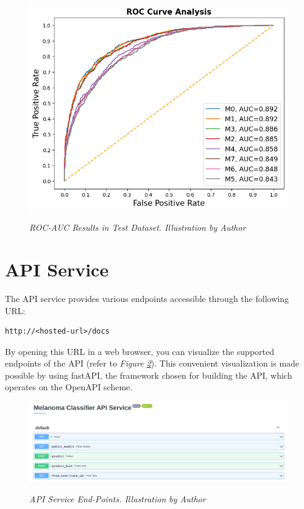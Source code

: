 \begin{figure}[H]
\centering
    \includegraphics[width=\textwidth]{imatges/results/rocaucanalysis-all.png}
\caption[ROC-AUC Results in Test Dataset]{\textit{ROC-AUC Results in Test Dataset. Illustration by Author}}
{\label{fig:rocaucanalysis-all}}
\end{figure}

\newpage

\section{API Service}

The API service provides various endpoints accessible through the following URL:

\begin{Verbatim}[fontsize=\scriptsize]
http://<hosted-url>/docs
\end{Verbatim}

By opening this URL in a web browser, you can visualize the supported endpoints of the API
(refer to \textit{Figure \ref{fig:api-endpoints}}). This convenient visualization is made possible by using fastAPI,
the framework chosen for building the API, which operates on the OpenAPI scheme.

\begin{figure}[H]
\centering
\begin{adjustbox}{width=\textwidth, trim={0.2cm 0cm 0.1cm 0cm}, clip}
    \includegraphics[width=\textwidth]{imatges/results/api-endpoints.png}
\end{adjustbox}
\caption[API Service End-Points]{\textit{API Service End-Points. Illustration by Author}}
{\label{fig:api-endpoints}}
\end{figure}

